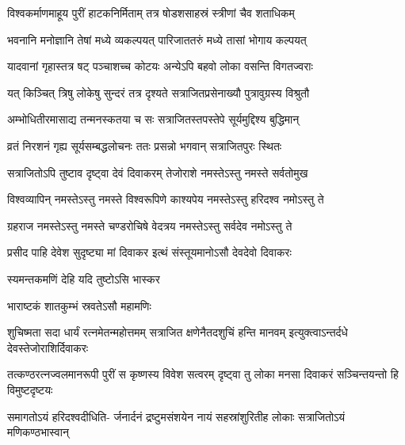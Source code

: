 \twolineshloka
{विश्वकर्माणमाहूय पुरीं हाटकनिर्मिताम्}
{तत्र षोडशसाहस्रं स्त्रीणां चैव शताधिकम्}%

\twolineshloka
{भवनानि मनोज्ञानि तेषां मध्ये व्यकल्पयत्}
{पारिजाततरुं मध्ये तासां भोगाय कल्पयत्}%

\twolineshloka
{यादवानां गृहास्तत्र षट् पञ्चाशच्च कोटयः}
{अन्येऽपि बहवो लोका वसन्ति विगतज्वराः}%

\twolineshloka
{यत् किञ्चित् त्रिषु लोकेषु सुन्दरं तत्र दृश्यते}
{सत्राजितप्रसेनाख्यौ पुत्रावुग्रस्य विश्रुतौ}%

\twolineshloka
{अम्भोधितीरमासाद्य तन्मनस्कतया च सः}
{सत्राजितस्तपस्तेपे सूर्यमुद्दिश्य बुद्धिमान्}%

\twolineshloka
{व्रतं निरशनं गृह्य सूर्यसम्बद्धलोचनः}
{ततः प्रसन्नो भगवान् सत्राजितपुरः स्थितः}%

\twolineshloka
{सत्राजितोऽपि तुष्टाव दृष्ट्वा देवं दिवाकरम्}
{तेजोराशे नमस्तेऽस्तु नमस्ते सर्वतोमुख}%

\twolineshloka
{विश्वव्यापिन् नमस्तेऽस्तु नमस्ते विश्वरूपिणे}
{काश्यपेय नमस्तेऽस्तु हरिदश्व नमोऽस्तु ते}%

\twolineshloka
{ग्रहराज नमस्तेऽस्तु नमस्ते चण्डरोचिषे}
{वेदत्रय नमस्तेऽस्तु सर्वदेव नमोऽस्तु ते}%

\twolineshloka
{प्रसीद पाहि देवेश सुदृष्ट्या मां दिवाकर}
{इत्थं संस्तूयमानोऽसौ देवदेवो दिवाकरः}%






\onelineshloka
{स्यमन्तकमणिं देहि यदि तुष्टोऽसि भास्कर}%


\onelineshloka
{भाराष्टकं शातकुम्भं स्रवतेऽसौ महामणिः}%

\threelineshloka
{शुचिष्मता सदा धार्यं रत्नमेतन्महोत्तमम्}
{सत्राजित क्षणेनैतदशुचिं हन्ति मानवम्}
{इत्युक्त्वाऽन्तर्दधे देवस्तेजोराशिर्दिवाकरः}%

\fourlineindentedshloka
{तत्कण्ठरत्नज्वलमानरूपी}
{पुरीं स कृष्णस्य विवेश सत्वरम्} 
{दृष्ट्वा तु लोका मनसा दिवाकरं}
{सञ्चिन्तयन्तो हि विमुष्टदृष्टयः}%

\fourlineindentedshloka
{समागतोऽयं हरिदश्वदीधिति-}
{र्जनार्दनं द्रष्टुमसंशयेन} 
{नायं सहस्रांशुरितीह लोकाः}
{सत्राजितोऽयं मणिकण्ठभास्वान्}%

